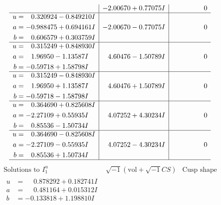 \documentclass[1p]{elsarticle_modified}
\theoremstyle{definition}
\newcommand{\I}{\sqrt{-1}}
\begin{document}
$$\begin{array}{c|c|c}
 & -2.00670 + 0.77075 I & \phantom{-0.000000 } 0 \\ \hline\begin{aligned}
u &= \phantom{-}0.320924 - 0.849210 I \\
a &= -0.988475 + 0.694161 I \\
b &= \phantom{-}0.606579 + 0.303759 I\end{aligned}
 & -2.00670 - 0.77075 I & \phantom{-0.000000 } 0 \\ \hline\begin{aligned}
u &= \phantom{-}0.315249 + 0.848930 I \\
a &= \phantom{-}1.96950 - 1.13587 I \\
b &= -0.59718 + 1.58798 I\end{aligned}
 & \phantom{-}4.60476 - 1.50789 I & \phantom{-0.000000 } 0 \\ \hline\begin{aligned}
u &= \phantom{-}0.315249 - 0.848930 I \\
a &= \phantom{-}1.96950 + 1.13587 I \\
b &= -0.59718 - 1.58798 I\end{aligned}
 & \phantom{-}4.60476 + 1.50789 I & \phantom{-0.000000 } 0 \\ \hline\begin{aligned}
u &= \phantom{-}0.364690 + 0.825608 I \\
a &= -2.27109 + 0.55935 I \\
b &= \phantom{-}0.85536 - 1.50734 I\end{aligned}
 & \phantom{-}4.07252 + 4.30234 I & \phantom{-0.000000 } 0 \\ \hline\begin{aligned}
u &= \phantom{-}0.364690 - 0.825608 I \\
a &= -2.27109 - 0.55935 I \\
b &= \phantom{-}0.85536 + 1.50734 I\end{aligned}
 & \phantom{-}4.07252 - 4.30234 I & \phantom{-0.000000 } 0\\
 \hline 
 \end{array}$$\newpage$$\begin{array}{c|c|c}  
\text{Solutions to }I^u_{1}& \I (\text{vol} + \sqrt{-1}CS) & \text{Cusp shape}\\
 \hline 
\begin{aligned}
u &= \phantom{-}0.878292 + 0.182741 I \\
a &= \phantom{-}0.481164 + 0.015312 I \\
b &= -0.133818 + 1.198810 I\end{aligned}

\end{array}$$
\end{document}
